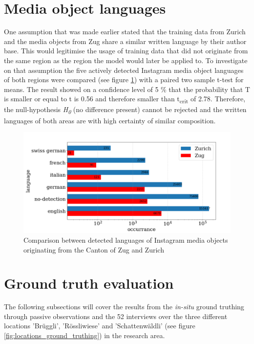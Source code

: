 \section{Media object languages}
One assumption that was made earlier stated that the training data from Zurich and the media objects from Zug share a similar written language by their author base. This would legitimise the usage of training data that did not originate from the same region as the region the model would later be applied to. To investigate on that assumption the five actively detected Instagram media object languages of both regions were compared (see figure \ref{fig:det_languages}) with a paired two sample t-test for means. The result showed on a confidence level of 5 \% that the probability that T is smaller or equal to t is 0.56 and therefore smaller than t\textsubscript{crit} of 2.78. Therefore, the null-hypothesis \textit{H\textsubscript{0}} (no difference present) cannot be rejected and the written languages of both areas are with high certainty of similar composition.

\begin{figure}[h!]
   \centering
   \includegraphics[width=\textwidth]{img/det_languages_bigger_font.pdf}
   \caption{Comparison between detected languages of Instagram media objects originating from the Canton of Zug and Zurich}
   \label{fig:det_languages}
\end{figure}

\section{Ground truth evaluation}
The following subsections will cover the results from the \textit{in-situ} ground truthing through passive observations and the 52 interviews over the three different locations 'Br\"uggli', 'R\"ossliwiese' and 'Schattenw\"aldli' (see figure \ref{fig:locations_ground_truthing}) in the research area. \\

